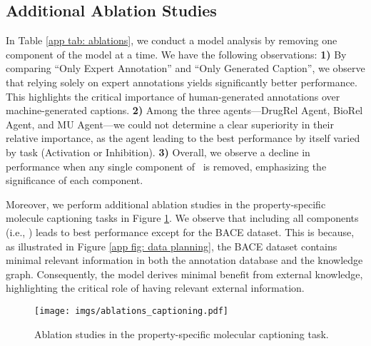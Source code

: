 \subsection{Additional Ablation Studies}
\label{app: additional ablation studies}
In Table \ref{app tab: ablations}, we conduct a model analysis by removing one component of the model at a time. We have the following observations:
\textbf{1)} By comparing ``Only Expert Annotation'' and ``Only Generated Caption'', we observe that relying solely on expert annotations yields significantly better performance. This highlights the critical importance of human-generated annotations over machine-generated captions.
\textbf{2)} Among the three agents—DrugRel Agent, BioRel Agent, and MU Agent—we could not determine a clear superiority in their relative importance, as the agent leading to the best performance by itself varied by task (Activation or Inhibition). 
\textbf{3)} Overall, we observe a decline in performance when any single component of \proposed~is removed, emphasizing the significance of each component.

Moreover, we perform additional ablation studies in the property-specific molecule captioning tasks in Figure \ref{app fig: ablations captioning}.
We observe that including all components (i.e., \proposed) leads to best performance except for the BACE dataset.
This is because, as illustrated in Figure \ref{app fig: data planning}, the BACE dataset contains minimal relevant information in both the annotation database and the knowledge graph. 
Consequently, the model derives minimal benefit from external knowledge, highlighting the critical role of having relevant external information.


\begin{figure}[h]
    \centering
    \begin{minipage}{0.54\linewidth}
        
    \end{minipage}
    \begin{minipage}{0.45\linewidth}
        \centering
        \vspace{4ex}
        \texttt{[image: imgs/ablations\_captioning.pdf]}
        \vspace{-2ex}
        \caption{Ablation studies in the property-specific molecular captioning task.}
        \label{app fig: ablations captioning}
    \end{minipage}
\end{figure}




